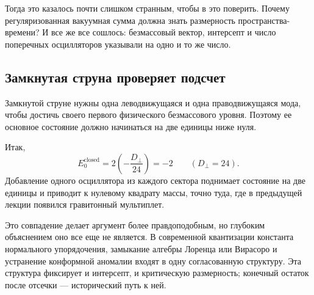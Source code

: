 \begin{classroomqa}
\end{classroomqa}

Тогда это казалось почти слишком странным, чтобы в это поверить. Почему регуляризованная вакуумная сумма должна знать размерность пространства-времени? И все же все сошлось: безмассовый вектор, интерсепт и число поперечных осцилляторов указывали на одно и то же число.

\subsection{Замкнутая струна проверяет подсчет}

Замкнутой струне нужны одна леводвижущаяся и одна праводвижущаяся мода, чтобы достичь своего первого физического безмассового уровня. Поэтому ее основное состояние должно начинаться на две единицы ниже нуля.

\begin{classroomqa}
\end{classroomqa}

Итак,
\begin{equation}
  E_0^{\mathrm{closed}}
  =
  2\left(-\frac{D_\perp}{24}\right)
  =-2
  \qquad (D_\perp=24).
\end{equation}
Добавление одного осциллятора из каждого сектора поднимает состояние на две единицы и приводит к нулевому квадрату массы, точно туда, где в предыдущей лекции появился гравитонный мультиплет.

Это совпадение делает аргумент более правдоподобным, но глубоким объяснением оно все еще не является. В современной квантизации константа нормального упорядочения, замыкание алгебры Лоренца или Вирасоро и устранение конформной аномалии входят в одну согласованную структуру. Эта структура фиксирует и интерсепт, и критическую размерность; конечный остаток после отсечки — исторический путь к ней.

